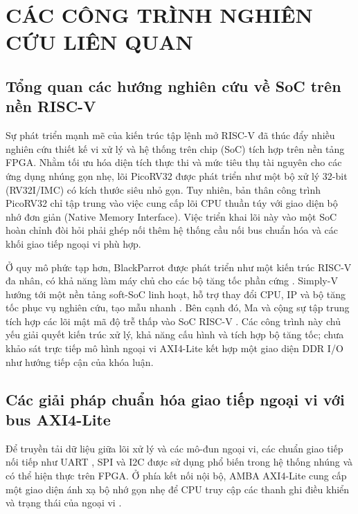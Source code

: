 \chapter{CÁC CÔNG TRÌNH NGHIÊN CỨU LIÊN QUAN}

\section{Tổng quan các hướng nghiên cứu về SoC trên nền RISC-V}

Sự phát triển mạnh mẽ của kiến trúc tập lệnh mở RISC-V \cite{riscv_unprivileged} đã thúc đẩy nhiều nghiên cứu thiết kế vi xử lý và hệ thống trên chip (SoC) tích hợp trên nền tảng FPGA. Nhằm tối ưu hóa diện tích thực thi và mức tiêu thụ tài nguyên cho các ứng dụng nhúng gọn nhẹ, lõi PicoRV32 \cite{picorv32_repo} được phát triển như một bộ xử lý 32-bit (RV32I/IMC) có kích thước siêu nhỏ gọn. Tuy nhiên, bản thân công trình PicoRV32 \cite{picorv32_repo} chỉ tập trung vào việc cung cấp lõi CPU thuần túy với giao diện bộ nhớ đơn giản (Native Memory Interface). Việc triển khai lõi này vào một SoC hoàn chỉnh đòi hỏi phải ghép nối thêm hệ thống cầu nối bus chuẩn hóa và các khối giao tiếp ngoại vi phù hợp.

Ở quy mô phức tạp hơn, BlackParrot được phát triển như một kiến trúc RISC-V đa nhân, có khả năng làm máy chủ cho các bộ tăng tốc phần cứng \cite{petrisko2020blackparrot}. Simply-V hướng tới một nền tảng soft-SoC linh hoạt, hỗ trợ thay đổi CPU, IP và bộ tăng tốc phục vụ nghiên cứu, tạo mẫu nhanh \cite{maisto2026simplyv}. Bên cạnh đó, Ma và cộng sự tập trung tích hợp các lõi mật mã độ trễ thấp vào SoC RISC-V \cite{ma2023riscvcrypto}. Các công trình này chủ yếu giải quyết kiến trúc xử lý, khả năng cấu hình và tích hợp bộ tăng tốc; chưa khảo sát trực tiếp mô hình ngoại vi AXI4-Lite kết hợp một giao diện DDR I/O như hướng tiếp cận của khóa luận.

\section{Các giải pháp chuẩn hóa giao tiếp ngoại vi với bus AXI4-Lite}

Để truyền tải dữ liệu giữa lõi xử lý và các mô-đun ngoại vi, các chuẩn giao tiếp nối tiếp như UART \cite{huang2024uartcommunication,wakhle2012uartvhdl,xie2024uartfpga,ti_uart_overview}, SPI \cite{analog_spi_overview} và I2C \cite{nxp_um10204} được sử dụng phổ biến trong hệ thống nhúng và có thể hiện thực trên FPGA. Ở phía kết nối nội bộ, AMBA AXI4-Lite cung cấp một giao diện ánh xạ bộ nhớ gọn nhẹ để CPU truy cập các thanh ghi điều khiển và trạng thái của ngoại vi \cite{arm_axi4_spec,amd_axi4lite_hls}.

